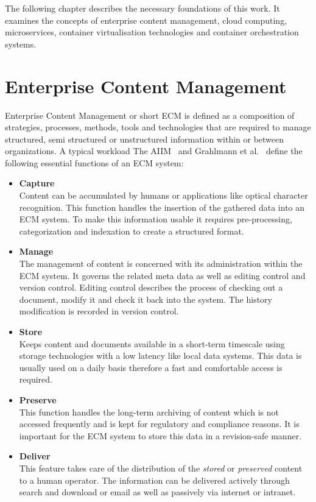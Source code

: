 The following chapter describes the necessary foundations of this work. It examines the concepts of enterprise content management, cloud computing, microservices, container virtualisation technologies and container orchestration systems.

\section{Enterprise Content Management}
Enterprise Content Management or short ECM is defined as a composition of strategies, processes, methods, tools and technologies that are required to manage structured, semi structured or unstructured information within or between organizations.
A typical workload
The AIIM~\cite{aiimECM} and Grahlmann et al.~\cite{grahlmann2012} define the following essential functions of an ECM system:
\begin{itemize}
    \item[]{\textbf{Capture}\\
    Content can be accumulated by humans or applications like optical character recognition.
    This function handles the insertion of the gathered data into an ECM system.
    To make this information usable it requires pre-processing, categorization and indexation to create a structured format.
    }
    \item[]{\textbf{Manage}\\
    The management of content is concerned with its administration within the ECM system.
    It governs the related meta data as well as editing control and version control.
    Editing control describes the process of checking out a document, modify it and check it back into the system.
    The history modification is recorded in version control.
    }
    \item[]{\textbf{Store}\\
    Keeps content and documents available in a short-term timescale using storage technologies with a low latency like local data systems.
    This data is usually used on a daily basis therefore a fast and comfortable access is required.
    }
    \item[]{\textbf{Preserve}\\
    This function handles the long-term archiving of content which is not accessed frequently and is kept for regulatory and compliance reasons.
    It is important for the ECM system to store this data in a revision-safe manner.
    }
    \item[]{\textbf{Deliver}\\
    This feature takes care of the distribution of the \textit{stored} or \textit{preserved} content to a human operator.
    The information can be delivered actively through search and download or email as well as passively via internet or intranet.
    }
\end{itemize}

